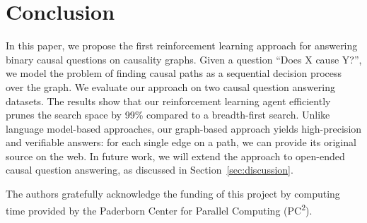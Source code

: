\section{Conclusion}
\label{sec:conclusion}

In this paper, we propose the first reinforcement learning approach for answering binary causal questions on causality graphs. Given a question ``Does X cause Y?'', we model the problem of finding causal paths as a sequential decision process over the graph. We evaluate our approach on two causal question answering datasets. The results show that our reinforcement learning agent efficiently prunes the search space by 99\% compared to a breadth-first search. Unlike language model-based approaches, our graph-based approach yields high-precision and verifiable answers: for each single edge on a path, we can provide its original source on the web. In future work, we will extend the approach to open-ended causal question answering, as discussed in Section~\ref{sec:discussion}.

\begin{acks}
The authors gratefully acknowledge the funding of this project by computing time provided by the Paderborn Center for Parallel Computing (PC\textsuperscript{2}).
\end{acks}
